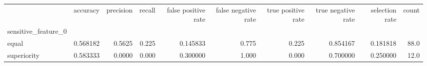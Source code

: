 \begin{tabular}{lrrrrrrrrr}
\toprule
{} &  accuracy &  precision &  recall &  false positive rate &  false negative rate &  true positive rate &  true negative rate &  selection rate &  count \\
sensitive\_feature\_0 &           &            &         &                      &                      &                     &                     &                 &        \\
\midrule
equal               &  0.568182 &     0.5625 &   0.225 &             0.145833 &                0.775 &               0.225 &            0.854167 &        0.181818 &   88.0 \\
superiority         &  0.583333 &     0.0000 &   0.000 &             0.300000 &                1.000 &               0.000 &            0.700000 &        0.250000 &   12.0 \\
\bottomrule
\end{tabular}
